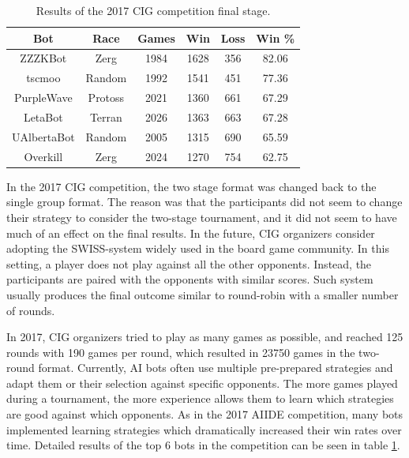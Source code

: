 \begin{table}[t]
\begin{center}
	\begin{tabular}{| c | c | c | c | c | c |}
		\hline
		\textbf{Bot} & \textbf{Race} & \textbf{Games} & \textbf{Win} & \textbf{Loss} & \textbf{Win \%} \\
		\hline
		ZZZKBot & Zerg & 1984 & 1628 & 356 & 82.06 \\
		\hline
		tscmoo & Random & 1992 & 1541 & 451 & 77.36 \\
		\hline
		PurpleWave & Protoss & 2021 & 1360 & 661 & 67.29 \\
		\hline
		LetaBot & Terran & 2026 & 1363 & 663 & 67.28 \\
		\hline
		UAlbertaBot & Random & 2005 & 1315 & 690 & 65.59 \\
		\hline
		Overkill & Zerg & 2024 & 1270 & 754 & 62.75 \\
		\hline
 \end{tabular}
 \end{center}  
 \caption{Results of the 2017 CIG competition final stage.}
 \label{tableCIG}
\end{table}

In the 2017 CIG competition, the two stage format was changed back to the single group format. The reason was that the participants did not seem to change their strategy to consider the two-stage tournament, and it did not seem to have much of an effect on the final results. In the future, CIG organizers consider adopting the SWISS-system widely used in the board game community. In this setting, a player does not play against all the other opponents. Instead, the participants are paired with the opponents with similar scores. Such system usually produces the final outcome similar to round-robin with a smaller number of rounds. 

In 2017, CIG organizers tried to play as many games as possible, and reached 125 rounds with 190 games per round, which resulted in 23750 games in the two-round format. Currently, AI bots often use multiple pre-prepared strategies and adapt them or their selection against specific opponents. The more games played during a tournament, the more experience allows them to learn which strategies are good against which opponents. As in the 2017 AIIDE competition, many bots implemented learning strategies which dramatically increased their win rates over time. Detailed results of the top 6 bots in the competition can be seen in table \ref{tableCIG}.

